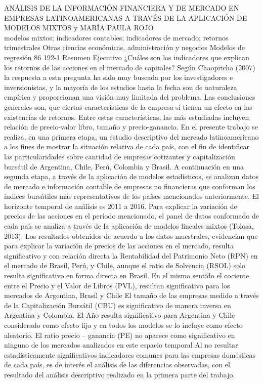 \A
{ANÁLISIS DE LA INFORMACIÓN FINANCIERA Y DE MERCADO EN EMPRESAS LATINOAMERICANAS A TRAVÉS DE LA APLICACIÓN DE MODELOS MIXTOS}
{ y MARÍA PAULA ROJO}
{
\\}
{modelos mixtos; indicadores contables; indicadores de mercado; retornos trimestrales} 
 {Otras ciencias económicas, administración y negocios} 
 {Modelos de regresión} 
 {86} 
 {192-1}
{Resumen Ejecutivo ¿Cuáles son los indicadores que explican los retornos de las acciones en el mercado de capitales? Según Chaopricha (2007) la respuesta a esta pregunta ha sido muy buscada por los investigadores e inversionistas, y la mayoría de los estudios hasta la fecha son de naturaleza empírica y proporcionan una visión muy limitada del problema. Las conclusiones generales son, que ciertas características de la empresa sí tienen un efecto en las existencias de retornos. Entre estas características, las más estudiadas incluyen relación de precio-valor libro, tamaño y precio-ganancia. En el presente trabajo se realiza, en una primera etapa, un estudio descriptivo del mercado latinoamericano a los fines de mostrar la situación relativa de cada país, con el fin de identificar las particularidades sobre cantidad de empresas cotizantes y capitalización bursátil de Argentina, Chile, Perú, Colombia y Brasil. A continuación en una segunda etapa, a través de la aplicación de modelos estadísticos, se analizan datos de mercado e información contable de empresas no financieras que conforman los índices bursátiles más representativos de los países mencionados anteriormente. El horizonte temporal de análisis es 2011 a 2016. Para explicar la variación de precios de las acciones en el período mencionado, el panel de datos conformado de cada país se analiza a través de la aplicación de modelos lineales mixtos (Tolosa, 2013). Los resultados obtenidos de acuerdo a los datos muestrales, evidencian que para explicar la variación de precios de las acciones en el mercado, resulta significativo y con relación directa la Rentabilidad del Patrimonio Neto (RPN) en el mercado de Brasil, Perú, y Chile, aunque el ratio de Solvencia (RSOL) solo resulta significativo en forma directa en Brasil. En el mismo sentido el cociente entre el Precio y el Valor de Libros (PVL), resultan significativo para los mercados de Argentina, Brasil y Chile El tamaño de las empresas medido a través de la Capitalización Bursátil (CBU) es significativo de manera inversa en Argentina y Colombia. El Año resulta significativo para Argentina y Chile considerado como efecto fijo y en todos los modelos se lo incluye como efecto aleatorio. El ratio precio – ganancia (PE) no aparece como significativo en ninguno de los mercados analizados en este espacio temporal Al no resultar estadísticamente significativos indicadores comunes para las empresas domésticas de cada país, es de interés el análisis de las diferencias observadas, con el resultado del análisis descriptivo realizado en la primera parte del trabajo. }

